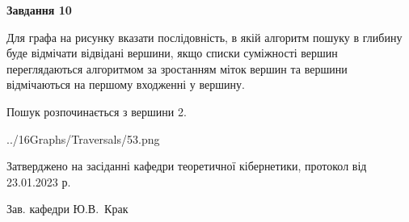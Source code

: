 \documentclass[12pt, ukrainian]{article}
\begin{document}
{\begin {large}
{\begin {center}\textbf{Завдання 10}\end {center}}\par
Для графа на рисунку вказати послідовність, в якій алгоритм пошуку в глибину буде відмічати відвідані вершини, якщо списки суміжності вершин переглядаються алгоритмом за зростанням міток вершин та вершини відмічаються на першому вход\-женні у вершину.\par
Пошук розпочинається з вершини 2.\par

\begin{center}
	{../16Graphs/Traversals/53.png}
\end{center}\par
\newpage


\end {large}
}
{\smallskip \begin {small} Затверджено на засіданні кафедри теоретичної кібернетики, протокол  від   23.01.2023 р.\par\smallskip\smallskip
{\parbox {6.5 cm}{Зав. кафедри \dotfill Ю.В.~Крак}} \end{small}}
\end{document}
